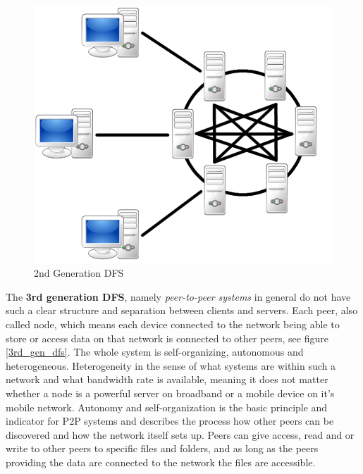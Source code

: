 	\begin{figure}[H]
		\begin{center}
		\includegraphics[scale=0.25]{Talk5/2nd_gen_dfs.PNG}
		\end{center}
		\caption{2nd Generation DFS}
		\label{2nd_gen_dfs}
	\end{figure}
The \textbf{3rd generation DFS}, namely \textit{peer-to-peer systems} in general do not have such a clear structure and separation between clients and servers. Each peer, also called node, which means each device connected to the network being able to store or access data on that network is connected to other peers, see figure \ref{3rd_gen_dfs}. The whole system is self-organizing, autonomous and heterogeneous. Heterogeneity in the sense of what systems are within such a network and what bandwidth rate is available, meaning it does not matter whether a node is a powerful server on broadband or a mobile device on it's mobile network. Autonomy and self-organization is the basic principle and indicator for P2P systems and describes the process how other peers can be discovered and how the network itself sets up. Peers can give access, read and or write to other peers to specific files and folders, and as long as the peers providing the data are connected to the network the files are accessible.
